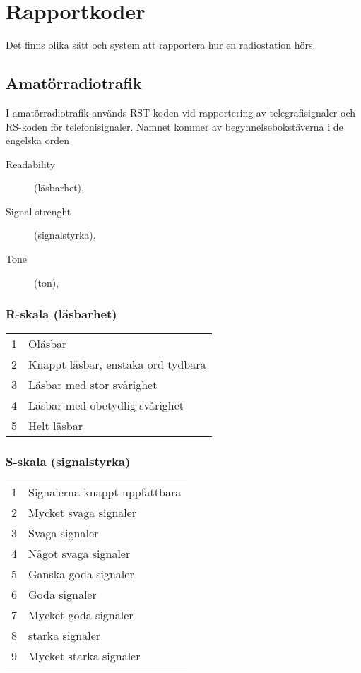 \chapter{Rapportkoder}
\label{Rapportkoder}

Det finns olika sätt och system att rapportera hur en radiostation hörs.

\section{Amatörradiotrafik}

I amatörradiotrafik används RST-koden vid rapportering av
telegrafisignaler och RS-koden för telefonisignaler.
Namnet kommer av begynnelsebokstäverna i de engelska orden

\begin{description}
  \item[Readability] (läsbarhet),
  \item[Signal strenght] (signalstyrka),
  \item[Tone] (ton),
\end{description}

\subsection{R-skala (läsbarhet)}

\begin{tabular}{p{}p{}}
1 & Oläsbar \\
2 & Knappt läsbar, enstaka ord tydbara \\
3 & Läsbar med stor svårighet \\
4 & Läsbar med obetydlig svårighet \\
5 & Helt läsbar \\
\end{tabular}

\subsection{S-skala (signalstyrka)}

\begin{tabular}{p{}p{}}
1 & Signalerna knappt uppfattbara \\
2 & Mycket svaga signaler \\
3 & Svaga signaler \\
4 & Något svaga signaler \\
5 & Ganska goda signaler \\
6 & Goda signaler \\
7 & Mycket goda signaler \\
8 & starka signaler \\
9 & Mycket starka signaler \\
\end{tabular}


